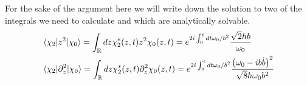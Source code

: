 For the sake of the argument here we will write down the solution to two of the integrals we need to calculate and which are analytically solvable.
\begin{align}
	  & \braket{\chi_{2}|z^2|\chi_{0}} =
        \int_{\mathbb{R}}dz \chi_{2}^{*}(z,t) z^2 \chi_{0}(z,t) =
        e^{2i\int_{0}^{t}dt\omega_{0}/b^2 }\frac{\sqrt{2}h b   }{\omega_0}\\
	  & \braket{\chi_{2}|\partial_z^2|\chi_{0}} =
        \int_{\mathbb{R}}dz \chi_{2}^{*}(z,t) \partial_z^2 \chi_{0}(z,t)=
        e^{2i\int_{0}^{t}dt\omega_{0}/b^2 }\frac{\left(\omega_0 - ib\dot{b}\right)^2}{ \sqrt{8} h\omega_0b^2 }
\end{align}
